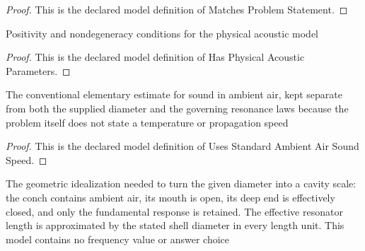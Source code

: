 \begin{proof}
  This is the declared model definition of Matches Problem Statement.
\end{proof}
\begin{definition}
  \label{def:physics:phyx-mini-0217:phyxminiproblems-problemphyxmini0217-hasphysicalacousticparameters}
  Positivity and nondegeneracy conditions for the physical acoustic model
\end{definition}
\begin{proof}
  This is the declared model definition of Has Physical Acoustic Parameters.
\end{proof}
\begin{definition}
  \label{def:physics:phyx-mini-0217:phyxminiproblems-problemphyxmini0217-usesstandardambientairsoundspeed}
  The conventional elementary estimate for sound in ambient air, kept separate from both the supplied diameter and the governing resonance laws because the problem itself does not state a temperature or propagation speed
\end{definition}
\begin{proof}
  This is the declared model definition of Uses Standard Ambient Air Sound Speed.
\end{proof}
\begin{definition}
  \label{def:physics:phyx-mini-0217:phyxminiproblems-problemphyxmini0217-usesfundamentalclosedopendiameterapproximation}
  The geometric idealization needed to turn the given diameter into a cavity scale: the conch contains ambient air, its mouth is open, its deep end is effectively closed, and only the fundamental response is retained. The effective resonator length is approximated by the stated shell diameter in every length unit. This model contains no frequency value or answer choice
\end{definition}
